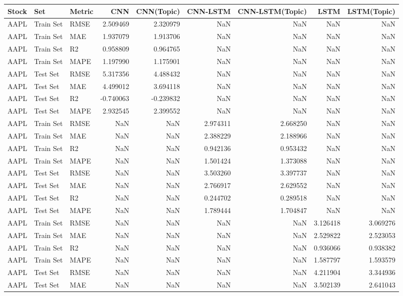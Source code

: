 \begin{tabular}{lllrrrrrr}
\toprule
Stock & Set & Metric & CNN & CNN(Topic) & CNN-LSTM & CNN-LSTM(Topic) & LSTM & LSTM(Topic) \\
\midrule
AAPL & Train Set & RMSE & 2.509469 & 2.320979 & NaN & NaN & NaN & NaN \\
AAPL & Train Set & MAE & 1.937079 & 1.913706 & NaN & NaN & NaN & NaN \\
AAPL & Train Set & R2 & 0.958809 & 0.964765 & NaN & NaN & NaN & NaN \\
AAPL & Train Set & MAPE & 1.197990 & 1.175901 & NaN & NaN & NaN & NaN \\
AAPL & Test Set & RMSE & 5.317356 & 4.488432 & NaN & NaN & NaN & NaN \\
AAPL & Test Set & MAE & 4.499012 & 3.694118 & NaN & NaN & NaN & NaN \\
AAPL & Test Set & R2 & -0.740063 & -0.239832 & NaN & NaN & NaN & NaN \\
AAPL & Test Set & MAPE & 2.932545 & 2.399552 & NaN & NaN & NaN & NaN \\
AAPL & Train Set & RMSE & NaN & NaN & 2.974311 & 2.668250 & NaN & NaN \\
AAPL & Train Set & MAE & NaN & NaN & 2.388229 & 2.188966 & NaN & NaN \\
AAPL & Train Set & R2 & NaN & NaN & 0.942136 & 0.953432 & NaN & NaN \\
AAPL & Train Set & MAPE & NaN & NaN & 1.501424 & 1.373088 & NaN & NaN \\
AAPL & Test Set & RMSE & NaN & NaN & 3.503260 & 3.397737 & NaN & NaN \\
AAPL & Test Set & MAE & NaN & NaN & 2.766917 & 2.629552 & NaN & NaN \\
AAPL & Test Set & R2 & NaN & NaN & 0.244702 & 0.289518 & NaN & NaN \\
AAPL & Test Set & MAPE & NaN & NaN & 1.789444 & 1.704847 & NaN & NaN \\
AAPL & Train Set & RMSE & NaN & NaN & NaN & NaN & 3.126418 & 3.069276 \\
AAPL & Train Set & MAE & NaN & NaN & NaN & NaN & 2.529822 & 2.523053 \\
AAPL & Train Set & R2 & NaN & NaN & NaN & NaN & 0.936066 & 0.938382 \\
AAPL & Train Set & MAPE & NaN & NaN & NaN & NaN & 1.587797 & 1.593579 \\
AAPL & Test Set & RMSE & NaN & NaN & NaN & NaN & 4.211904 & 3.344936 \\
AAPL & Test Set & MAE & NaN & NaN & NaN & NaN & 3.502139 & 2.641043 \\

\end{tabular}
